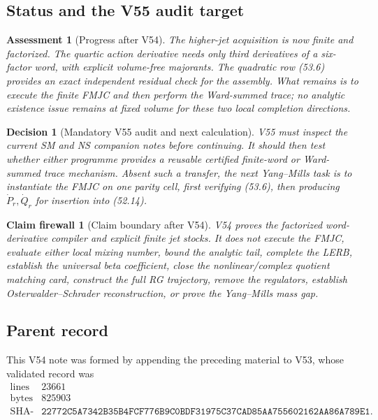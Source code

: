 \documentclass[11pt,oneside]{book}
\newtheorem{assessment}[theorem]{Assessment}
\newtheorem{firewall}[theorem]{Claim firewall}
\newtheorem{decision}[theorem]{Decision}
\theoremstyle{definition}
\theoremstyle{remark}
\begin{document}
\subsection{Status and the V55 audit target}

\begin{assessment}[Progress after V54]
\label{ass:e8v54-status}
The higher-jet acquisition is now finite and factorized.  The
quartic action derivative needs only third derivatives of a
six-factor word, with explicit volume-free majorants.  The
quadratic row (53.6) provides an exact independent residual check
for the assembly.  What remains is to execute the finite FMJC and
then perform the Ward-summed trace; no analytic existence issue
remains at fixed volume for these two local completion directions.
\end{assessment}

\begin{decision}[Mandatory V55 audit and next calculation]
\label{dec:e8v54-next}
V55 must inspect the current SM and NS companion notes before
continuing.  It should then test whether either programme provides
a reusable certified finite-word or Ward-summed trace mechanism.
Absent such a transfer, the next Yang--Mills task is to instantiate
the FMJC on one parity cell, first verifying (53.6), then producing
\(\dot P_r,\dot Q_r\) for insertion into (52.14).
\end{decision}

\begin{firewall}[Claim boundary after V54]
\label{fire:e8v54-claim}
V54 proves the factorized word-derivative compiler and explicit
finite jet stocks.  It does not execute the FMJC, evaluate either
local mixing number, bound the analytic tail, complete the LERB,
establish the universal beta coefficient, close the
nonlinear/complex quotient matching card, construct the full RG
trajectory, remove the regulators, establish
Osterwalder--Schrader reconstruction, or prove the Yang--Mills mass
gap.
\end{firewall}

\subsection{Parent record}

This V54 note was formed by appending the preceding material to V53,
whose validated record was
\[
\begin{array}{c|c}
\text{lines}&23661\\
\text{bytes}&825903\\
\text{SHA-256}&
\texttt{22772C5A7342B35B4FCF776B9C0BDF31975C37CAD85AA755602162AA86A789E1}.
\end{array}
\]
\end{document}
